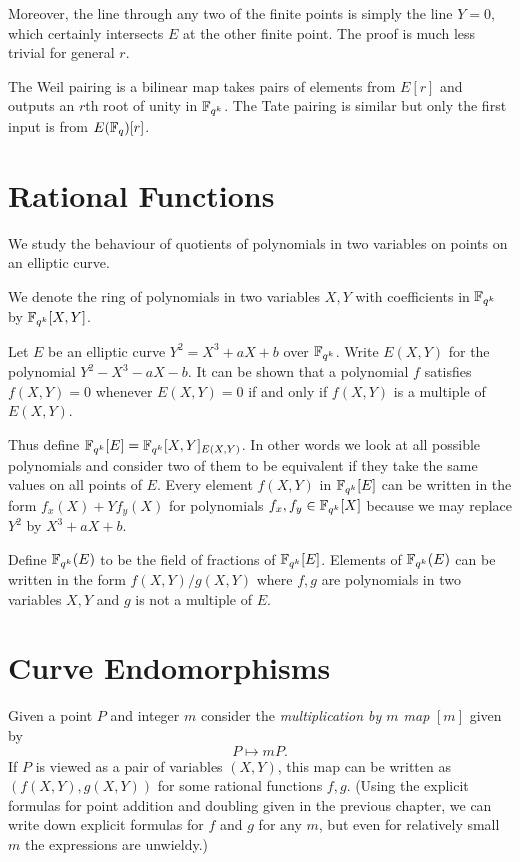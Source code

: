 Moreover,
the line through any two of the finite points is simply the line $Y = 0$,
which certainly intersects $E$ at the other finite point.
The proof is much less trivial for general $r$.

The Weil pairing is a bilinear map
takes pairs of elements from $E[r]$ and outputs an $r$th root of unity
in $\mathbb{F}_{q^k}$. The Tate pairing is similar but only the first
input is from $E(\mathbb{F}_q)[r]$.

\section {Rational Functions}

We study the behaviour of quotients of polynomials in two variables on
points on an elliptic curve.

We denote the ring of polynomials in two variables $X,Y$
with coefficients in $\mathbb{F}_{q^k}$ by $\mathbb{F}_{q^k}[X,Y]$. 

Let $E$ be an elliptic curve $Y^2 = X^3 + aX + b$ over $\mathbb{F}_{q^k}$.
Write $E(X,Y)$ for the polynomial $Y^2 - X^3 - aX - b$.
It can be shown that a polynomial $f$ satisfies $f(X,Y) = 0$
whenever $E(X,Y) = 0$ if and only if $f(X,Y)$ is a multiple of $E(X,Y)$.

Thus define $\mathbb{F}_{q^k}[E] = \mathbb{F}_{q^k}[X,Y]_{E(X,Y)}$. In other words we look at all
possible polynomials and consider two of them to be
equivalent if they take the same values on all points of $E$.
Every element $f(X,Y)$ in $\mathbb{F}_{q^k}[E]$ can be written in the form
$f_x(X) + Y f_y(X)$ for polynomials $f_x, f_y \in \mathbb{F}_{q^k}[X]$ because
we may replace $Y^2$ by $X^3 + aX + b$.

Define $\mathbb{F}_{q^k}(E)$ to be the field of fractions of $\mathbb{F}_{q^k}[E]$.
Elements of $\mathbb{F}_{q^k}(E)$ can be written in the form
$f(X,Y) / g(X,Y)$ where $f, g$ are polynomials in two variables $X, Y$
and $g$ is not a multiple of $E$.

\section {Curve Endomorphisms}

Given a point $P$ and integer $m$ consider the \emph{multiplication by $m$ map}
$[m]$ given by \[ P \mapsto m P . \]
If $P$ is viewed as a pair of variables $(X,Y)$, this map
can be written as $(f(X,Y), g(X,Y))$ for some rational functions $f,g$.
(Using the explicit formulas for point addition and doubling
given in the previous chapter, we can write down
explicit formulas for $f$ and $g$ for any $m$, but even for relatively
small $m$ the expressions are unwieldy.)

